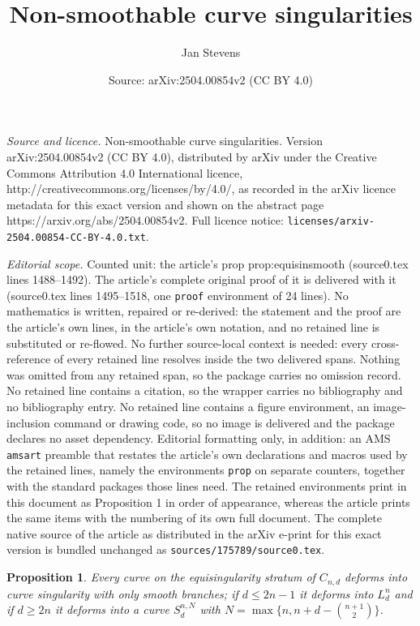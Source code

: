 \documentclass[10pt,a4paper]{amsart}
\title{Non-smoothable curve singularities}
\author{Jan Stevens}
\date{Source: arXiv:2504.00854v2 (CC BY 4.0)}
\newtheorem{prop}{Proposition}
\begin{document}
\maketitle

\noindent\emph{Source and licence.} Non-smoothable curve singularities. Version arXiv:2504.00854v2 (CC BY 4.0), distributed by arXiv under the Creative Commons Attribution 4.0 International licence, http://creativecommons.org/licenses/by/4.0/, as recorded in the arXiv licence metadata for this exact version and shown on the abstract page https://arxiv.org/abs/2504.00854v2. Full licence notice: \texttt{licenses/arxiv-2504.00854-CC-BY-4.0.txt}.\par\smallskip

\noindent\textit{Editorial scope.} Counted unit: the article's prop prop:equisinsmooth (source0.tex lines 1488--1492). The article's complete original proof of it is delivered with it (source0.tex lines 1495--1518, one \texttt{proof} environment of 24 lines). No mathematics is written, repaired or re-derived: the statement and the proof are the article's own lines, in the article's own notation, and no retained line is substituted or re-flowed.  No further source-local context is needed: every cross-reference of every retained line resolves inside the two delivered spans.  Nothing was omitted from any retained span, so the package carries no omission record.  No retained line contains a citation, so the wrapper carries no bibliography and no bibliography entry.  No retained line contains a figure environment, an image-inclusion command or drawing code, so no image is delivered and the package declares no asset dependency.  Editorial formatting only, in addition: an AMS \texttt{amsart} preamble that restates the article's own declarations and macros used by the retained lines, namely the environments \texttt{prop} on separate counters, together with the standard packages those lines need.  The retained environments print in this document as Proposition 1 in order of appearance, whereas the article prints the same items with the numbering of its own full document.  The complete native source of the article as distributed in the arXiv e-print for this exact version is bundled unchanged as \texttt{sources/175789/source0.tex}.
\begin{prop}\label{prop:equisinsmooth}
Every curve on the equisingularity stratum of $C_{n,d}$ deforms into curve singularity with only smooth
branches; if $d\leq 2n-1$ it deforms into $L_d^n$ and if $d\geq 2n$ it deforms into a curve 
$S_d^{n,N}$ with  $N=\max\{n,n+d-\binom{n+1}2\}$.
\end{prop}
\end{document}
